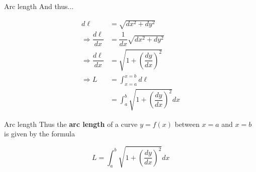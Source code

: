 \documentclass{beamer}
\begin{document}
\begin{frame}{Arc length}
	And thus...
	
	\begin{align*}
		d\ell &= \sqrt{dx^2 + dy^2}\\
		\Rightarrow \dfrac{d\ell}{dx} &= \dfrac{1}{dx}\sqrt{dx^2 + dy^2}\\
		\Rightarrow \dfrac{d\ell}{dx} &= \sqrt{1 + \left(\dfrac{dy}{dx}\right)^2}\\
		\Rightarrow L &= \int_{x = a}^{x = b} d\ell\\
		&= \int_a^b \sqrt{1 + \left(\dfrac{dy}{dx}\right)^2} dx
	\end{align*}
\end{frame}

\begin{frame}{Arc length}
	Thus the \textbf{arc length} of a curve $y = f(x)$ between $x = a$ and $x = b$ is given by the formula
	
	$$ L = \int_a^b \sqrt{1 + \left(\dfrac{dy}{dx}\right)^2} dx $$
\end{frame}
\end{document}
